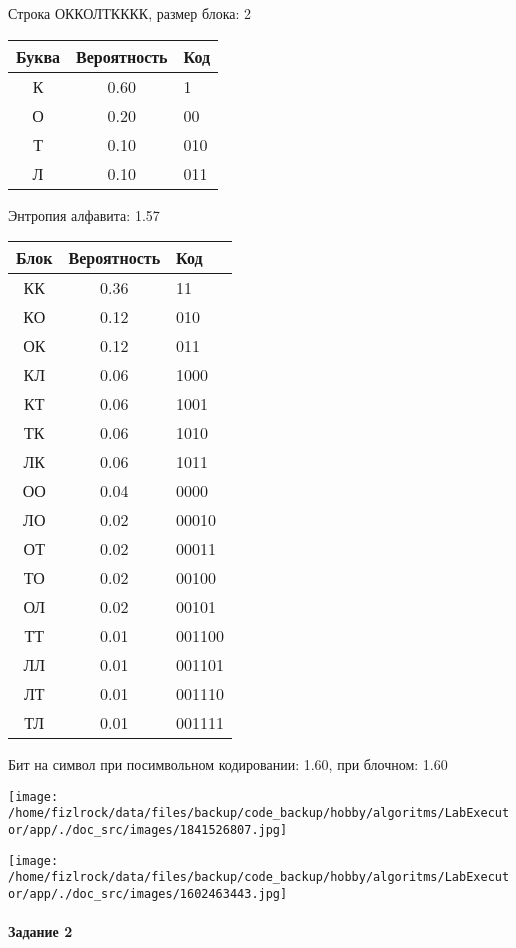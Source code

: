 \documentclass[a4paper, 12pt]{article}
\begin{document}
Строка ОККОЛТКККК, размер блока: 2
\begin{center}
 \begin{tabular}{ |c|c|l| } 
  \hline
     Буква & Вероятность & Код\\ \hline
К & 0.60 & 1\\\hline
О & 0.20 & 00\\\hline
Т & 0.10 & 010\\\hline
Л & 0.10 & 011
\\ \hline \end{tabular}
\end{center}
Энтропия алфавита: 1.57
\begin{center}
 \begin{tabular}{ |c|c|l| } 
  \hline
     Блок & Вероятность & Код\\ \hline
КК & 0.36 & 11\\\hline
КО & 0.12 & 010\\\hline
ОК & 0.12 & 011\\\hline
КЛ & 0.06 & 1000\\\hline
КТ & 0.06 & 1001\\\hline
ТК & 0.06 & 1010\\\hline
ЛК & 0.06 & 1011\\\hline
ОО & 0.04 & 0000\\\hline
ЛО & 0.02 & 00010\\\hline
ОТ & 0.02 & 00011\\\hline
ТО & 0.02 & 00100\\\hline
ОЛ & 0.02 & 00101\\\hline
ТТ & 0.01 & 001100\\\hline
ЛЛ & 0.01 & 001101\\\hline
ЛТ & 0.01 & 001110\\\hline
ТЛ & 0.01 & 001111
\\ \hline \end{tabular}
\end{center}
Бит на символ при посимвольном кодировании: 1.60, при блочном: 1.60

\texttt{[image: /home/fizlrock/data/files/backup/code\_backup/hobby/algoritms/LabExecutor/app/./doc\_src/images/1841526807.jpg]}

\texttt{[image: /home/fizlrock/data/files/backup/code\_backup/hobby/algoritms/LabExecutor/app/./doc\_src/images/1602463443.jpg]}
\pagebreak
\paragraph{Задание 2}
\end{document}
